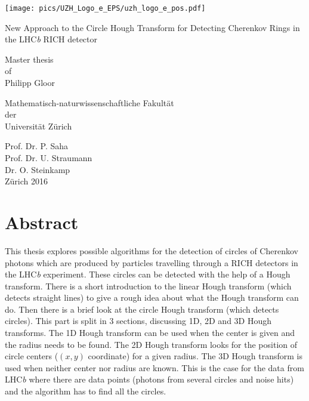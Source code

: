 \documentclass[11pt,twoside]{scrreprt}
\begin{document}
\begin{titlepage}
  \texttt{[image: pics/UZH\_Logo\_e\_EPS/uzh\_logo\_e\_pos.pdf]}
  \vspace{1cm}

  \Huge\centering New Approach to the Circle Hough Transform for Detecting
        Cherenkov Rings in the LHC\textit{b} RICH detector 

  \noindent\makebox[\textwidth]{\rule{\textwidth}{0.4pt}}

\vspace{1cm}

{\centering
  \Large Master thesis\\
  of\\
  Philipp Gloor
  \vspace{1.5cm}

  \Large Mathematisch-naturwissenschaftliche Fakultät\\
  der\\
  Universität Zürich
  \vspace{2cm}

  \Large 
  Prof. Dr. P. Saha\\
  Prof. Dr. U. Straumann\\
  Dr. O. Steinkamp\\
\vspace*{\fill}
\Large Zürich 2016


  }
\end{titlepage}
\chapter*{Abstract}
This thesis explores possible algorithms for the detection of circles of Cherenkov photons which are produced by particles 
travelling through a RICH detectors in the LHC\textit{b} experiment. These circles can be detected with the help of a Hough 
transform. There is a short introduction to the linear Hough transform (which detects straight lines) to give a rough idea about 
what the Hough transform can do. Then there is a brief look at the circle Hough transform (which detects circles). This part is 
split in 3 sections, discussing 1D, 2D and 3D Hough transforms. The 1D Hough transform can be used when the center is given and the radius 
needs to be found. The 2D Hough transform looks for the position of circle centers ($(x,y)$ coordinate) for a given radius. 
The 3D Hough transform is used when neither center nor radius are known. This is the case for the data from LHC\textit{b} 
where there are data points (photons from several circles and noise hits) and the algorithm has to find all the circles.
\end{document}
